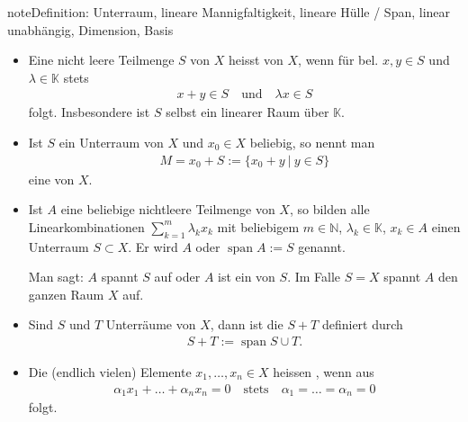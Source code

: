 \documentclass[letterpaper,10pt,english]{jupyterBook}
\begin{document}
\begin{sphinxadmonition}{note}{Definition: Unterraum, lineare Mannigfaltigkeit, lineare Hülle / Span, linear unabhängig, Dimension, Basis}
\begin{itemize}
\item {} 
Eine nicht leere Teilmenge \(S\)  von \(X\) heisst  von \(X\), wenn für bel. \(x,y \in S\)  und \(\lambda \in \mathbb{K}\) stets
\begin{equation*}
\begin{split}x+y \in S\quad\text{und}\quad \lambda x \in S\end{split}
\end{equation*}
folgt. Insbesondere ist \(S\) selbst ein linearer Raum über \(\mathbb{K}\).

\item {} 
Ist \(S\) ein Unterraum von \(X\) und \(x_0\in X\) beliebig, so nennt man
\begin{equation*}
\begin{split}M = x_0 + S := \{x_0+y\ |\ y\in S\}\end{split}
\end{equation*}
eine  von \(X\).

\item {} 
Ist \(A\) eine beliebige nichtleere Teilmenge von \(X\), so bilden alle Linearkombinationen \(\sum_{k=1}^m \lambda_k x_k\) mit beliebigem \(m \in \mathbb{N}\), \(\lambda_k\in\mathbb{K}\), \(x_k \in A\) einen Unterraum \(S\subset X\). Er wird  \(A\) oder \(\mathop{span} A := S\) genannt.

Man sagt: \(A\) spannt \(S\) auf oder \(A\) ist ein  von \(S\). Im Falle \(S=X\) spannt \(A\) den ganzen Raum \(X\) auf.

\item {} 
Sind \(S\) und \(T\) Unterräume von \(X\), dann ist die  \(S+T\) definiert durch
\begin{equation*}
\begin{split}S+T := \mathop{span} S \cup T.\end{split}
\end{equation*}
\item {} 
Die (endlich vielen) Elemente \(x_1, \ldots, x_n\in X\) heissen , wenn aus
\begin{equation*}
\begin{split}\alpha_1 x_1 + \ldots + \alpha_n x_n = 0\quad\text{stets}\quad \alpha_1 = \ldots = \alpha_n = 0\end{split}
\end{equation*}
folgt.


\end{itemize}
\end{sphinxadmonition}
\end{document}
